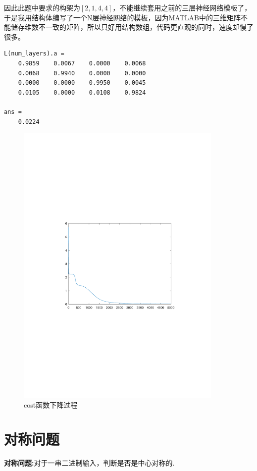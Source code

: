因此此题中要求的构架为$[2,1,4,4]$，不能继续套用之前的三层神经网络模板了，于是我用结构体编写了一个N层神经网络的模板，因为MATLAB中的三维矩阵不能储存维数不一致的矩阵，所以只好用结构数组，代码更直观的同时，速度却慢了很多。

\begin{lstlisting}
L(num_layers).a =
    0.9859    0.0067    0.0000    0.0068
    0.0068    0.9940    0.0000    0.0000
    0.0000    0.0000    0.9950    0.0045
    0.0105    0.0000    0.0108    0.9824

ans =
    0.0224
\end{lstlisting}

\begin{figure}[H]
\centering
\includegraphics[width=10cm]{fig/encode2.pdf}
\caption{cost函数下降过程}
\end{figure}

\newpage
\section{对称问题}
\textbf{对称问题:}对于一串二进制输入，判断是否是中心对称的.

